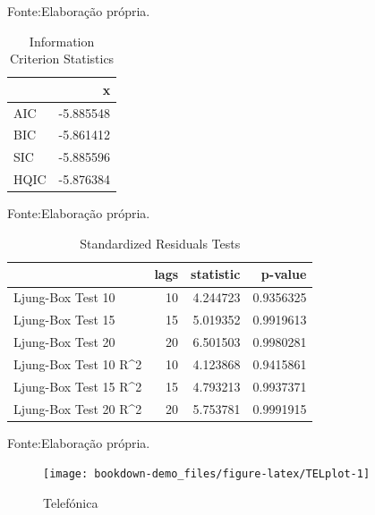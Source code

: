 \documentclass[
  12pt,
  a4paper,
  openany]{book}
\begin{document}
Fonte:Elaboração própria.

\justifying
\bigskip

\begin{table}[!h]

\caption{\label{tab:unnamed-chunk-13}Information Criterion Statistics}
\centering
\begin{tabular}[t]{lr}
\toprule
  & x\\
\midrule
AIC & -5.885548\\
BIC & -5.861412\\
SIC & -5.885596\\
HQIC & -5.876384\\
\bottomrule
\end{tabular}
\end{table}
\FloatBarrier
\centering

Fonte:Elaboração própria.

\justifying
\bigskip

\begin{table}[!h]

\caption{\label{tab:unnamed-chunk-14}Standardized Residuals Tests}
\centering
\begin{tabular}[t]{lrrr}
\toprule
  & lags & statistic & p-value\\
\midrule
Ljung-Box Test 10 & 10 & 4.244723 & 0.9356325\\
Ljung-Box Test 15 & 15 & 5.019352 & 0.9919613\\
Ljung-Box Test 20 & 20 & 6.501503 & 0.9980281\\
Ljung-Box Test 10 R\textasciicircum{}2 & 10 & 4.123868 & 0.9415861\\
Ljung-Box Test 15 R\textasciicircum{}2 & 15 & 4.793213 & 0.9937371\\
\addlinespace
Ljung-Box Test 20 R\textasciicircum{}2 & 20 & 5.753781 & 0.9991915\\
\bottomrule
\end{tabular}
\end{table}
\FloatBarrier
\centering

Fonte:Elaboração própria.

\justifying
\bigskip
\begin{figure}

{\centering \texttt{[image: bookdown-demo\_files/figure-latex/TELplot-1]} 

}

\caption{Telefónica}\label{fig:TELplot}
\end{figure}
\FloatBarrier
\centering
\end{document}

